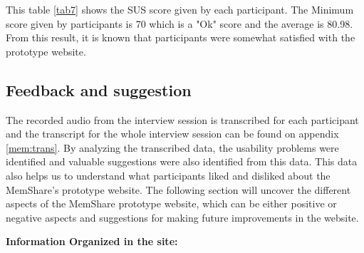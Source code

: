 \documentclass[mscthesis]{usiinfthesis}
\begin{document}
This table \ref{tab7} shows the SUS score given by each participant. The Minimum score given by participants is 70 which is a "Ok" score and the average is 80.98. From this result, it is known that participants were somewhat satisfied with the prototype website. 

\subsection{Feedback and suggestion}
\label{fed}
The recorded audio from the interview session is transcribed for each participant and the transcript for the whole interview session can be found on appendix \ref{mem:trans}. By analyzing the transcribed data, the usability problems were identified and valuable suggestions were also identified from this data. This data also helps us to understand what participants liked and disliked about the MemShare's prototype website. The following section will uncover the different aspects of the MemShare prototype website, which can be either positive or negative aspects and suggestions for making future improvements in the website.
\newline

\textbf{Information Organized in the site:}
\end{document}
